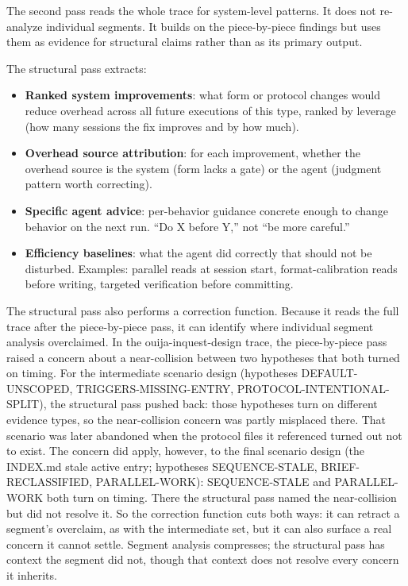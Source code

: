 \documentclass[11pt,a4paper]{article}
\begin{document}
The second pass reads the whole trace for system-level patterns. It does not
re-analyze individual segments. It builds on the piece-by-piece findings but
uses them as evidence for structural claims rather than as its primary output.

The structural pass extracts:

\begin{itemize}
  \item \textbf{Ranked system improvements}: what form or protocol changes
    would reduce overhead across all future executions of this type, ranked by
    leverage (how many sessions the fix improves and by how much).
  \item \textbf{Overhead source attribution}: for each improvement, whether the
    overhead source is the system (form lacks a gate) or the agent (judgment
    pattern worth correcting).
  \item \textbf{Specific agent advice}: per-behavior guidance concrete enough
    to change behavior on the next run. ``Do X before Y,'' not ``be more
    careful.''
  \item \textbf{Efficiency baselines}: what the agent did correctly that should
    not be disturbed. Examples: parallel reads at session start,
    format-calibration reads before writing, targeted verification before
    committing.
\end{itemize}

The structural pass also performs a correction function. Because it reads the
full trace after the piece-by-piece pass, it can identify where individual
segment analysis overclaimed. In the ouija-inquest-design trace, the
piece-by-piece pass raised a concern about a near-collision between two
hypotheses that both turned on timing. For the intermediate scenario design
(hypotheses DEFAULT-UNSCOPED, TRIGGERS-MISSING-ENTRY, PROTOCOL-INTENTIONAL-SPLIT),
the structural pass pushed back: those hypotheses turn on different evidence
types, so the near-collision concern was partly misplaced there. That scenario
was later abandoned when the protocol files it referenced turned out not to
exist. The concern did apply, however, to the final scenario design (the INDEX.md
stale active entry; hypotheses SEQUENCE-STALE, BRIEF-RECLASSIFIED, PARALLEL-WORK):
SEQUENCE-STALE and PARALLEL-WORK both turn on timing. There the structural pass
named the near-collision but did not resolve it. So the correction function cuts
both ways: it can retract a segment's overclaim, as with the intermediate set,
but it can also surface a real concern it cannot settle.
Segment analysis compresses; the structural pass has context the segment did
not, though that context does not resolve every concern it inherits.
\end{document}
